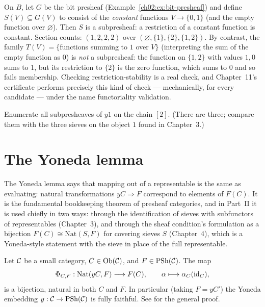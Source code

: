 \begin{example}\label{ch02:ex:sub-bit}
On $B$, let $G$ be the bit presheaf
(Example~\ref{ch02:ex:bit-presheaf}) and define
$S(V) \subseteq G(V)$ to consist of the \emph{constant} functions
$V \to \{0,1\}$ (and the empty function over $\varnothing$). Then $S$
is a subpresheaf: a restriction of a constant function is constant.
Section counts: $(1, 2, 2, 2)$ over
$(\varnothing, \{1\}, \{2\}, \{1,2\})$. By contrast, the family
$T(V) = \{$functions summing to $1$ over $V\}$ (interpreting the sum
of the empty function as $0$) is \emph{not} a subpresheaf: the
function on $\{1,2\}$ with values $1, 0$ sums to $1$, but its
restriction to $\{2\}$ is the zero function, which sums to $0$ and so
fails membership. Checking restriction-stability is a real check, and
Chapter~11's certificate performs precisely this kind of check ---
mechanically, for every candidate --- under the name functoriality
validation.
\end{example}

\begin{exercise}\label{ch02:exr:sub-two-chain}
Enumerate all subpresheaves of $y1$ on the chain $[2]$. (There are
three; compare them with the three sieves on the object $1$ found in
Chapter~3.)
\end{exercise}

\section{The Yoneda lemma}\label{ch02:sec:yoneda}

The Yoneda lemma says that mapping out of a representable is the same as
evaluating: natural transformations $yC \Rightarrow F$ correspond to
elements of $F(C)$. It is the fundamental bookkeeping theorem of
presheaf categories, and in Part~II it is used chiefly in two ways:
through the identification of sieves with subfunctors of representables
(Chapter~3), and through the sheaf condition's formulation as a
bijection $F(C) \cong \mathrm{Nat}(S, F)$ for covering sieves $S$
(Chapter~4), which is a Yoneda-style statement with the sieve in place
of the full representable.

\begin{theorem}\label{ch02:thm:yoneda}
Let $\mathcal{C}$ be a small category, $C \in \mathrm{Ob}(\mathcal{C})$, and
$F \in \mathrm{PSh}(\mathcal{C})$. The map
\[
\Phi_{C,F} : \mathrm{Nat}(yC, F) \longrightarrow F(C),
\qquad \alpha \longmapsto \alpha_C(\mathrm{id}_C),
\]
is a bijection, natural in both $C$ and $F$. In particular
(taking $F = yC'$) the Yoneda embedding $y : \mathcal{C} \to \mathrm{PSh}(\mathcal{C})$ is
fully faithful. See \cite{riehl,awodey,maclanecwm} for the general
proof.
\end{theorem}

